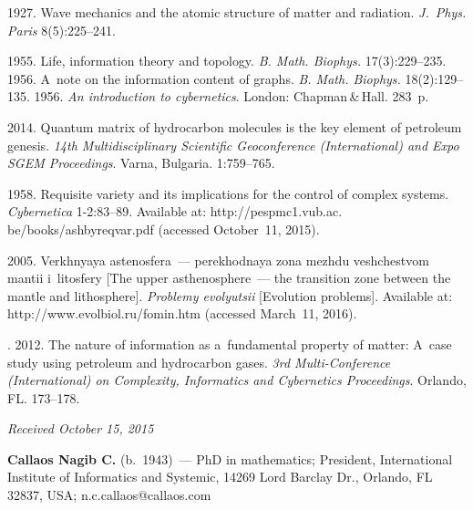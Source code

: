 \begin{multicols}{2}
{{\begin{thebibliography}{99}
 1927. Wave mechanics and the atomic structure of matter and radiation. 
\textit{J.~Phys. Paris}  8(5):225--241.

 1955. Life, information theory and topology. \textit{B.
Math. Biophys.} 17(3):229--235. 
 1956. A~note on the information content of graphs. \textit{B. 
Math. Biophys.} 18(2):129--135. 
 1956.  \textit{An introduction to 
cybernetics}. London: Chapman\,\&\,Hall. 283~p.

 2014. Quantum matrix of hydrocarbon molecules is the key 
element of petroleum genesis. \textit{14th Multidisciplinary Scientific Geoconference 
(International) and Expo SGEM Proceedings}.  Varna, Bulgaria. 1:759--765.

 1958. Requisite variety and its implications for the control of complex 
systems. \textit{Cybernetica} 1-2:83--89. Available at:  
{\sf  http://pespmc1.vub.ac. be/books/ashbyreqvar.pdf} 
(accessed  October~11, 2015).  

 2005. Verkhnyaya astenosfera~--- perekhodnaya zona 
mezhdu veshchestvom mantii i~li\-to\-sfe\-ry [The upper asthenosphere~--- 
the transition zone between the mantle and lithosphere]. 
\textit{Problemy evo\-lyu\-tsii} [Evolution problems]. Available at: 
{\sf http://www.\linebreak evolbiol.ru/fomin.htm} (accessed March~11, 2016).

. 2012. The nature of information as 
a~fundamental property of matter: A~case study using petroleum and hydrocarbon gases. 
\textit{3rd Multi-Conference (International) on Complexity, Informatics and Cybernetics Proceedings}. 
Orlando, FL. 173--178.
\end{thebibliography} }
 }

\end{multicols}

\vspace*{-6pt}

\hfill{\small\textit{Received October 15, 2015}}

\vspace*{-12pt}

\Contr

\noindent
\textbf{Callaos Nagib C.} (b.\ 1943)~--- PhD  in mathematics; President, 
International Institute of Informatics and Systemic, 14269 Lord Barclay Dr., 
Orlando, FL 32837, USA; n.c.callaos@callaos.com


